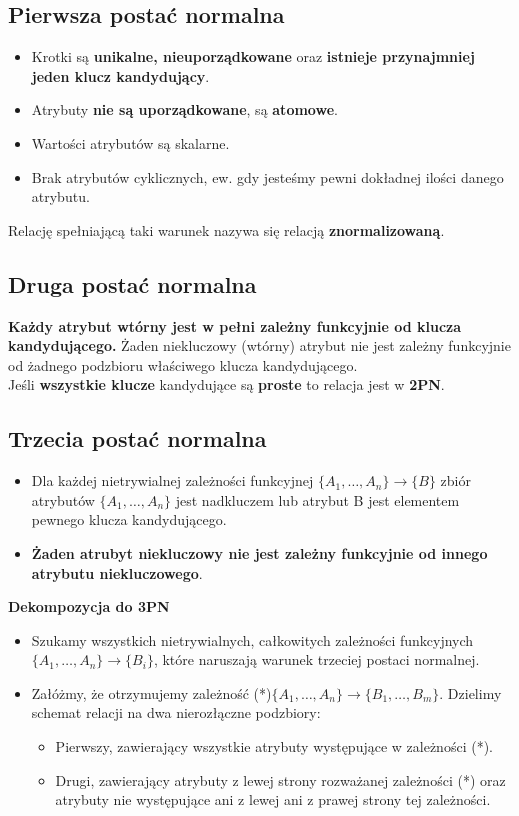 \documentclass[a4paper]{article}
\begin{document}
\subsection{Pierwsza postać normalna}
\begin{itemize}
    \item Krotki są \textbf{unikalne, nieuporządkowane} oraz \textbf{istnieje przynajmniej jeden klucz kandydujący}.
    \item Atrybuty \textbf{nie są uporządkowane}, są \textbf{atomowe}.
    \item Wartości atrybutów są skalarne.
    \item Brak atrybutów cyklicznych, ew. gdy jesteśmy pewni dokładnej ilości danego atrybutu.
\end{itemize}
Relację spełniającą taki warunek nazywa się relacją
\textbf{znormalizowaną}.

\subsection{Druga postać normalna}
\textbf{Każdy atrybut wtórny jest w pełni zależny funkcyjnie od klucza kandydującego.}
Żaden niekluczowy (wtórny) atrybut nie jest zależny funkcyjnie od żadnego podzbioru właściwego klucza kandydującego.\\

Jeśli \textbf{wszystkie klucze} kandydujące są \textbf{proste} to relacja jest w \textbf{2PN}.

\subsection{Trzecia postać normalna}
\begin{itemize}
    \item Dla każdej nietrywialnej zależności funkcyjnej $\{A_1,\dots,A_n\} \rightarrow \{B\}$ zbiór atrybutów $\{A_1,\dots,A_n\}$ jest nadkluczem lub atrybut B jest elementem pewnego klucza kandydującego.
    \item \textbf{Żaden atrubyt niekluczowy nie jest zależny funkcyjnie od innego atrybutu niekluczowego}.
\end{itemize}

\textbf{Dekompozycja do 3PN}
\begin{itemize}
    \item Szukamy wszystkich nietrywialnych, całkowitych zależności funkcyjnych $\{A_1,\dots,A_n\} \rightarrow \{B_i\}$, które naruszają warunek trzeciej postaci normalnej. 
    \item Załóżmy, że otrzymujemy zależność (*)$\{A_1,\dots,A_n\} \rightarrow \{B_1, \dots, B_m\}$. Dzielimy schemat relacji na dwa nierozłączne podzbiory:
    \begin{itemize}
        \item Pierwszy, zawierający wszystkie atrybuty występujące w zależności (*).
        \item Drugi, zawierający atrybuty z lewej strony rozważanej zależności (*) oraz atrybuty nie występujące ani z lewej ani z prawej strony tej zależności. 
    \end{itemize}
\end{itemize}
\end{document}
